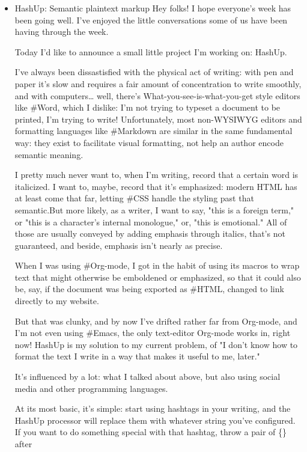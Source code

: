 \documentclass[11pt]{article}
\begin{document}
\begin{itemize}
\item HashUp: Semantic plaintext markup
\label{sec:orga59dda4}
Hey folks! I hope everyone's week has been going well. I've enjoyed the little conversations some of us have been having through the week.

Today I'd like to announce a small little project I'm working on: HashUp.

I've always been dissastisfied with the physical act of writing: with pen and paper it's slow and requires a fair amount of concentration to write smoothly, and with computers\ldots{} well, there's What-you-see-is-what-you-get style editors like \#Word, which I dislike: I'm not trying to typeset a document to be printed, I'm trying to write! Unfortunately, most non-WYSIWYG editors and formatting languages like \#Markdown are similar in the same fundamental way: they exist to facilitate visual formatting, not help an author encode semantic meaning.

I pretty much never want to, when I'm writing, record that a certain word is italicized. I want to, maybe, record that it's emphasized: modern HTML has at least come that far, letting \#CSS handle the styling past that semantic.But more likely, as a writer, I want to say, "this is a foreign term," or "this is a character's internal monologue," or, "this is emotional." All of those are usually conveyed by adding emphasis through italics, that's not guaranteed, and beside, emphasis isn't nearly as precise.

When I was using \#Org-mode, I got in the habit of using its macros to wrap text that might otherwise be emboldened or emphasized, so that it could also be, say, if the document was being exported as \#HTML, changed to link directly to my website.

But that was clunky, and by now I've drifted rather far from Org-mode, and I'm not even using \#Emacs, the only text-editor Org-mode works in, right now! HashUp is my solution to my current problem, of "I don't know how to format the text I write in a way that makes it useful to me, later."

It's influenced by a lot: what I talked about above, but also using social media and other programming languages.

At its most basic, it's simple: start using hashtags in your writing, and the HashUp processor will replace them with whatever string you've configured. If you want to do something special with that hashtag, throw a pair of \{\} after


\end{itemize}
\end{document}
